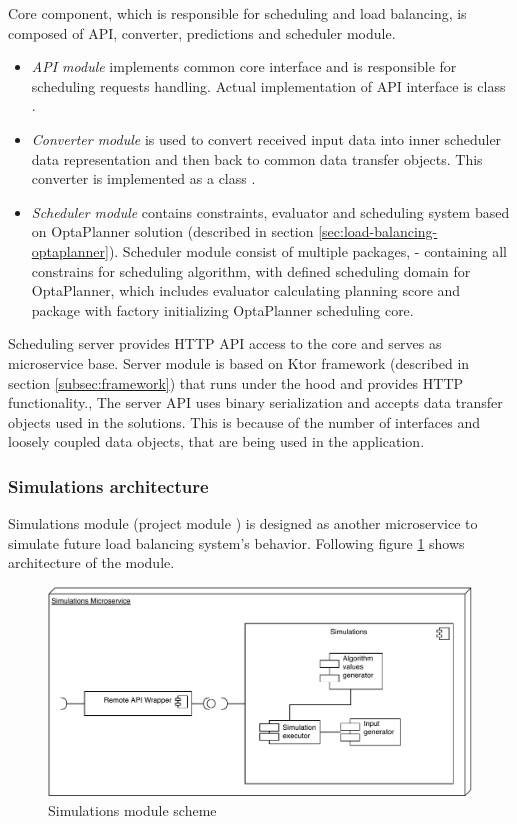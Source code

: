Core component, 
which is responsible for scheduling and load balancing,
is composed of API, converter, predictions and scheduler module.
\begin{itemize}
    \item \textit{API module} implements common core interface  
    and is responsible for scheduling requests handling.
    Actual implementation of API interface is class .
    \item \textit{Converter module} is used to convert received input data into inner scheduler data representation 
    and then back to common data transfer objects. 
    This converter is implemented as a class .
    \item \textit{Scheduler module} contains constraints, evaluator and scheduling system based on OptaPlanner solution
    (described in section \ref{sec:load-balancing-optaplanner}).
    Scheduler module consist of multiple packages, 
     - containing all constrains for scheduling algorithm,
     with defined scheduling domain for OptaPlanner,
     which includes evaluator calculating planning score
    and  package with factory initializing OptaPlanner scheduling core.
\end{itemize}

Scheduling server provides HTTP API access to the core
and serves as microservice base.
Server module is based on Ktor framework (described in section \ref{subsec:framework})
that runs under the hood and provides HTTP functionality.,
The server API uses binary serialization and accepts data transfer objects used in the solutions.
This is because of the number of interfaces and loosely coupled data objects,
that are being used in the application.

\subsubsection{Simulations architecture}\label{subsec:simulations-architecture}
Simulations module (project module ) is designed as another microservice to simulate future load balancing system's behavior.
Following figure \ref{fig:simulations-arch} shows architecture of the module.  

\begin{figure}[h]
    \includegraphics[width=\textwidth]{i_simulations.pdf}
    \centering
    \caption{Simulations module scheme}
    \label{fig:simulations-arch}
\end{figure}

